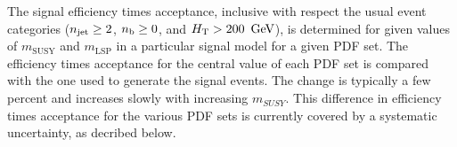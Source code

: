 The signal efficiency times acceptance, inclusive with respect the
usual event categories (\ie $n_{\text{jet}} \geq 2$, $n_{\text{b}} \geq 0$, and
$\mbox{$H_\text{T}$}>200~\,\text{Ge\hspace{-.08em}V}$), is determined for given values of
$m_\mathrm{SUSY}$ and $m_\mathrm{LSP}$ in a particular signal model
for a given PDF set. The efficiency times acceptance for the central
value of each PDF set is compared with the one used to generate the
signal events. The change is typically a few percent and increases
slowly with increasing $m_{SUSY}$. This difference in efficiency times
acceptance for the various PDF sets is currently covered by a
systematic uncertainty, as decribed below. 

%
%
%
%
